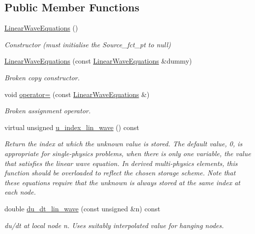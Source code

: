 \subsection*{Public Member Functions}
\begin{DoxyCompactItemize}
\item 
\hyperlink{classoomph_1_1LinearWaveEquations_a3c434f9aef855a40403b74127fb36984}{Linear\+Wave\+Equations} ()
\begin{DoxyCompactList}\small\item\em Constructor (must initialise the Source\+\_\+fct\+\_\+pt to null) \end{DoxyCompactList}\item 
\hyperlink{classoomph_1_1LinearWaveEquations_a611ab736d3b90455327c5a2812f8fbf0}{Linear\+Wave\+Equations} (const \hyperlink{classoomph_1_1LinearWaveEquations}{Linear\+Wave\+Equations} \&dummy)
\begin{DoxyCompactList}\small\item\em Broken copy constructor. \end{DoxyCompactList}\item 
void \hyperlink{classoomph_1_1LinearWaveEquations_af112a0fd4a6801de7046132bf12dc6df}{operator=} (const \hyperlink{classoomph_1_1LinearWaveEquations}{Linear\+Wave\+Equations} \&)
\begin{DoxyCompactList}\small\item\em Broken assignment operator. \end{DoxyCompactList}\item 
virtual unsigned \hyperlink{classoomph_1_1LinearWaveEquations_aba49f677e10850fc49d76a982522ce69}{u\+\_\+index\+\_\+lin\+\_\+wave} () const
\begin{DoxyCompactList}\small\item\em Return the index at which the unknown value is stored. The default value, 0, is appropriate for single-\/physics problems, when there is only one variable, the value that satisfies the linear wave equation. In derived multi-\/physics elements, this function should be overloaded to reflect the chosen storage scheme. Note that these equations require that the unknown is always stored at the same index at each node. \end{DoxyCompactList}\item 
double \hyperlink{classoomph_1_1LinearWaveEquations_a207b45abfb3197cabe7f375a458c1a0f}{du\+\_\+dt\+\_\+lin\+\_\+wave} (const unsigned \&n) const
\begin{DoxyCompactList}\small\item\em du/dt at local node n. Uses suitably interpolated value for hanging nodes. \end{DoxyCompactList}\item 

\end{DoxyCompactItemize}
